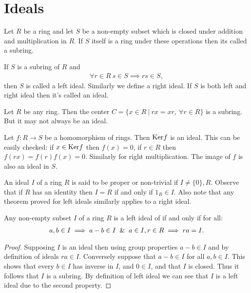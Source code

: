 \section{Ideals}
\begin{definition}
  Let $R$ be a ring and let $S$ be a non-empty subset which is closed under addition and multiplication in $R$. If $S$ itself is a ring under these operations then its called a subring.
\end{definition}
\begin{definition}
  If $S$ is a subring of $R$ and
  \begin{align*}
    \forall r\in R\ s\in S \implies rs \in S,
  \end{align*}
  then $S$ is called a left ideal. Similarly we define a right ideal. If $S$ is both left and right ideal then it's called an ideal.
\end{definition}
\begin{example}
  Let $R$ be any ring. Then the center $C = \{x\in R\ |\ rx = xr,\ \forall r\in R\}$ is a subring. But it may not always be an ideal.
\end{example}
\begin{example}
  Let $f: R\to S$ be a homomorphism of rings. Then $\text{Ker} f$ is an ideal. This can be easily checked: if $x\in \text{Ker} f$ then $f(x) = 0$, if $r\in R$ then $f(rx) = f(r)f(x) = 0$. Similarly for right multiplication. The image of $f$ is also an ideal in $S$.
\end{example}
\begin{remark}
  An ideal $I$ of a ring $R$ is said to be proper or non-trivial if $I\neq \{0\},R$. Observe that if $R$ has an identity then $I=R$ if and only if $1_R\in I$. Also note that any theorem proved for left ideals similarly applies to a right ideal.
\end{remark}
\begin{theorem}
  Any non-empty subset $I$ of a ring $R$ is a left ideal of if and only if for all:
  \begin{align*}
    a,b\in I \implies a-b\in I \And a\in I, r\in R \implies ra = I.
  \end{align*}
\end{theorem}
\begin{proof}
  Supposing $I$ is an ideal then using group properties $a-b\in I$ and by definition of ideals $ra\in I$. Conversely suppose that $a-b\in I$ for all $a,b\in I$. This shows that every $b\in I$ has inverse in $I$, and $0\in I$, and that $I$ is closed. Thus it follows that $I$ is a subring. By definition of left ideal we can see that $I$ is a left ideal due to the second property.
\end{proof}
